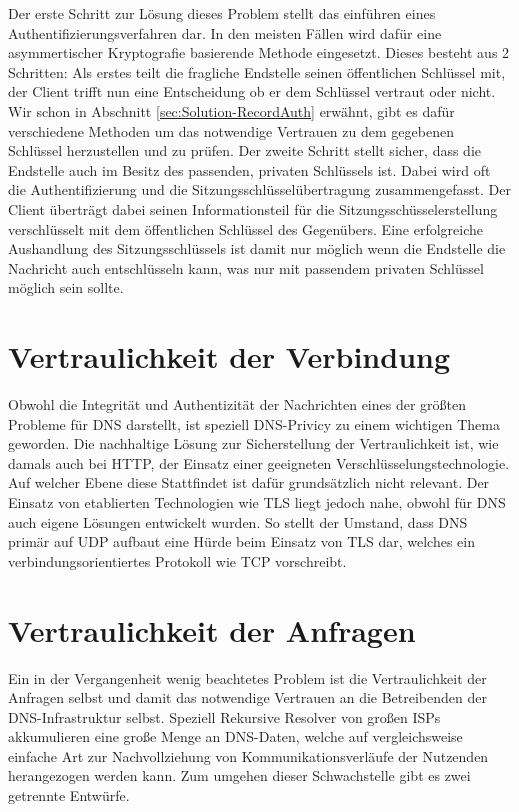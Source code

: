 Der erste Schritt zur Lösung dieses Problem stellt das einführen eines Authentifizierungsverfahren dar. In den meisten Fällen wird dafür eine asymmertischer Kryptografie basierende Methode eingesetzt. Dieses besteht aus 2 Schritten: Als erstes teilt die fragliche Endstelle seinen öffentlichen Schlüssel mit, der Client trifft nun eine Entscheidung ob er dem Schlüssel vertraut oder nicht. Wir schon in Abschnitt \ref{sec:Solution-RecordAuth} erwähnt, gibt es dafür verschiedene Methoden um das notwendige Vertrauen zu dem gegebenen Schlüssel herzustellen und zu prüfen. Der zweite Schritt stellt sicher, dass die Endstelle auch im Besitz des passenden, privaten Schlüssels ist. Dabei wird oft die Authentifizierung und die Sitzungsschlüsselübertragung zusammengefasst. Der Client überträgt dabei seinen Informationsteil für die Sitzungsschüsselerstellung verschlüsselt mit dem öffentlichen Schlüssel des Gegenübers. Eine erfolgreiche Aushandlung des Sitzungsschlüssels ist damit nur möglich wenn die Endstelle die Nachricht auch entschlüsseln kann, was nur mit passendem privaten Schlüssel möglich sein sollte. 

\section{Vertraulichkeit der Verbindung}

Obwohl die Integrität und Authentizität der Nachrichten eines der größten Probleme für DNS darstellt, ist speziell DNS-Privicy zu einem wichtigen Thema geworden. Die nachhaltige Lösung zur Sicherstellung der Vertraulichkeit ist, wie damals auch bei HTTP, der Einsatz einer geeigneten Verschlüsselungstechnologie. Auf welcher Ebene diese Stattfindet ist dafür grundsätzlich nicht relevant. Der Einsatz von etablierten Technologien wie TLS liegt jedoch nahe, obwohl für DNS auch eigene Lösungen entwickelt wurden. So stellt der Umstand, dass DNS primär auf UDP aufbaut eine Hürde beim Einsatz von TLS dar, welches ein verbindungsorientiertes Protokoll wie TCP vorschreibt.

\section{Vertraulichkeit der Anfragen}
\label{sec:solutions-PrivRequest}

Ein in der Vergangenheit wenig beachtetes Problem ist die Vertraulichkeit der Anfragen selbst und damit das notwendige Vertrauen an die Betreibenden der DNS-Infrastruktur selbst. Speziell Rekursive Resolver von großen ISPs akkumulieren eine große Menge an DNS-Daten, welche auf vergleichsweise einfache Art zur Nachvollziehung von Kommunikationsverläufe der Nutzenden herangezogen werden kann. Zum umgehen dieser Schwachstelle gibt es zwei getrennte Entwürfe.

